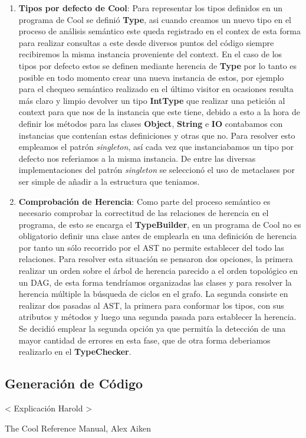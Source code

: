 \documentclass{article}
\begin{document}
\begin{enumerate}
	\item[] \textbf{Tipos por defecto de Cool}: Para representar los tipos definidos en un programa de Cool se defini\'o \textbf{Type}, asi cuando creamos un nuevo tipo en el proceso de an\'alisis sem\'antico este queda registrado en el contex de esta forma para realizar consultas a este desde diversos puntos del c\'odigo siempre recibiremos la misma instancia proveniente del context. En el caso de los tipos por defecto estos se definen mediante herencia de \textbf{Type} por lo tanto es posible en todo momento crear una nueva instancia de estos, por ejemplo para el chequeo sem\'antico realizado en el \'ultimo visitor en ocasiones resulta m\'as claro y limpio devolver un tipo \textbf{IntType} que realizar una petici\'on al context para que nos de la instancia que este tiene, debido a esto a la hora de definir los m\'etodos para las clases \textbf{Object}, \textbf{String} e \textbf{IO} contabamos con instancias que conten\'ian estas definiciones y otras que no. Para resolver esto empleamos el patr\'on \textit{singleton}, as\'i cada vez que instanciabamos un tipo por defecto nos referiamos a la misma instancia. De entre las diversas implementaciones del patr\'on \textit{singleton} se seleccion\'o el uso de metaclases por ser simple de a\~nadir a la estructura que teniamos.
	
	\item[] \textbf{Comprobaci\'on de Herencia}: Como parte del proceso sem\'antico es necesario comprobar la correctitud de las relaciones de herencia en el programa, de esto se encarga el \textbf{TypeBuilder}, en un programa de Cool no es obligatorio definir una clase antes de emplearla en una definici\'on de herencia por tanto un s\'olo recorrido por el AST no permite establecer del todo las relaciones. Para resolver esta situaci\'on se pensaron dos opciones, la primera realizar un orden sobre el \'arbol de herencia parecido a el orden topol\'ogico en un DAG, de esta forma tendr\'iamos organizadas las clases y para resolver la herencia m\'ultiple la b\'usqueda de ciclos en el grafo. La segunda consiste en realizar dos pasadas al AST, la primera para conformar los tipos, con sus atributos y m\'etodos y luego una segunda pasada para establecer la herencia. Se decidi\'o emplear la segunda opci\'on ya que permit\'ia la detecci\'on de una mayor cantidad de errores en esta fase, que de otra forma deberiamos realizarlo en el \textbf{TypeChecker}. 
	
\end{enumerate}

\subsection{Generaci\'on de C\'odigo}

< Explicaci\'on Harold >

\begin{thebibliography}{99}
	 The Cool Reference Manual, Alex Aiken
\end{thebibliography}

\end{document}
